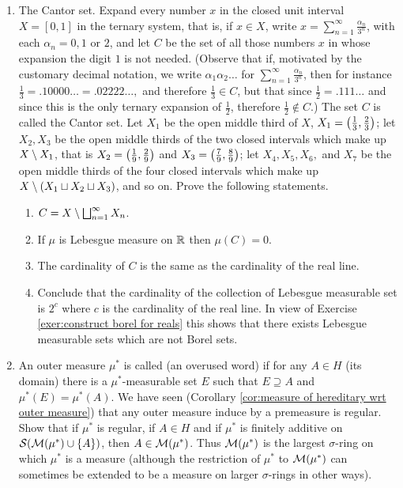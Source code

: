 \begin{enumerate}[label=\arabic*),ref=\arabic*]
\item\label{exer:cantor set}
The Cantor set. Expand every number $x$ in the closed unit interval $X=[0,1]$ in the ternary system, that is, if $x\in X$, write $x=\sum_{n=1}^\infty\frac{\alpha_n}{3^n}$, with each $\alpha_n=0,1$ or $2$, and let $C$ be the set of all those numbers $x$ in whose expansion the digit $1$ is not needed. (Observe that if, motivated by the customary decimal notation, we write $\alpha_1\alpha_2\dots$ for $\sum_{n=1}^\infty\frac{\alpha_n}{3^n}$, then for instance $\frac13=.10000\dots=.02222\dots,$ and therefore $\frac13\in C$, but that since $\frac12=.111\dots$ and since this is the only ternary expansion of $\frac12$, therefore $\frac12\notin C$.) The set $C$ is called the Cantor set. Let $X_1$ be the open middle third of $X$, $X_1=\left(\frac13,\frac23\right)$; let $X_2,X_3$ be the open middle thirds of the two closed intervals which make up $X\setminus X_1$, that is $X_2=\left(\frac19,\frac29\right)$ and $X_3=\left(\frac79,\frac89\right)$; let $X_4,X_5,X_6,$ and $X_7$ be the open middle thirds of the four closed intervals which make up $X\setminus(X_1\sqcup X_2\sqcup X_3)$, and so on. Prove the following statements.
\begin{enumerate}
    \item $C=X\setminus\bigsqcup_{n=1}^\infty X_n$.
    \item If $\mu$ is Lebesgue measure on $\mathbb{R}$ then $\mu(C)=0$.
    \item The cardinality of $C$ is the same as the cardinality of the real line.
    \item Conclude that the cardinality of the collection of Lebesgue measurable set is $2^c$ where $c$ is the cardinality of the real line. In view of Exercise \ref{exer:construct borel for reals} this shows that there exists Lebesgue measurable sets which are not Borel sets.
\end{enumerate}

\item An outer measure $\mu^*$ is called  (an overused word) if for any $A\in H$ (its domain) there is a $\mu^*$-measurable set $E$ such that $E\supseteq A$ and $\mu^*(E)=\mu^*(A)$. We have seen (Corollary \ref{cor:measure of hereditary wrt outer measure}) that any outer measure induce by a premeasure is regular. Show that if $\mu^*$ is regular, if $A\in H$ and if $\mu^*$ is finitely additive on ${\cal S}({\cal M}(\mu^*)\cup\left\{A\right\})$, then $A\in{\cal M}(\mu^*)$. Thus ${\cal M}(\mu^*)$ is the largest $\sigma$-ring on which $\mu^*$ is a measure (although the restriction of $\mu^*$ to ${\cal M}(\mu^*)$ can sometimes be extended to be a measure on larger $\sigma$-rings in other ways).


\end{enumerate}
